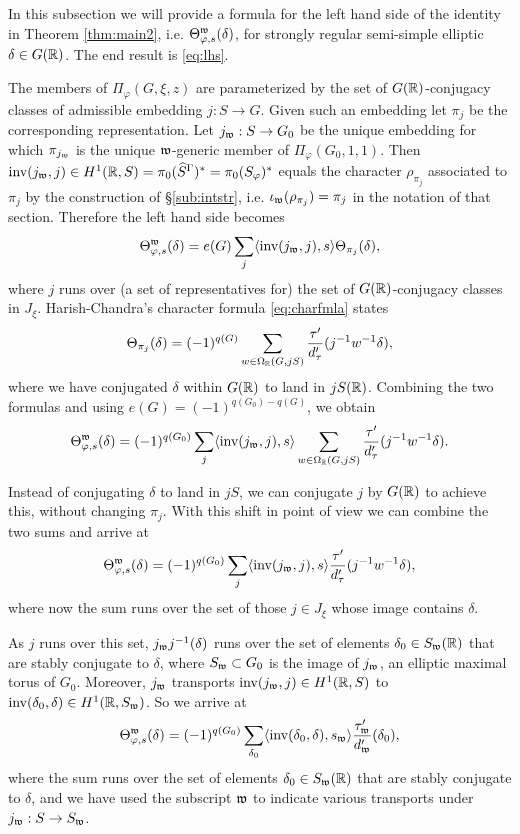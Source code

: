 \documentclass{article}
\theoremstyle{definition}
\numberwithin{equation}{section}
\renewcommand{\-}{\hyp{}}
\begin{document}
In this subsection we will provide a formula for the left hand side of the identity in Theorem \ref{thm:main2}, i.e. $\Theta^{\mathfrak{w}}_{\varphi,s}(\delta)$, for strongly regular semi-simple elliptic $\delta \in G(\mathbb{R})$. The end result is \eqref{eq:lhs}.

The members of $\Pi_\varphi(G,\xi,z)$ are parameterized by the set of $G(\mathbb{R})$-conjugacy classes of admissible embedding $j : S \to G$. Given such an embedding let $\pi_j$ be the corresponding representation. Let $j_{\mathfrak{w}} : S \to G_0$ be the unique embedding for which $\pi_{j_{\mathfrak{w}}}$ is the unique $\mathfrak{w}$-generic member of $\Pi_\varphi(G_0,1,1)$. Then $\textrm{inv}(j_{\mathfrak{w}},j) \in H^1(\mathbb{R},S)=\pi_0(\widehat S^\Gamma)^*=\pi_0(S_\varphi)^*$ equals the character $\rho_{\pi_j}$ associated to $\pi_j$ by the construction of \S\ref{sub:intstr}, i.e. $\iota_{\mathfrak{w}}(\rho_{\pi_j})=\pi_j$ in the notation of that section. Therefore the left hand side becomes
\[ \Theta^{\mathfrak{w}}_{\varphi,s}(\delta)=e(G)\sum_j \langle\textrm{inv}(j_{\mathfrak{w}},j),s\rangle\Theta_{\pi_j}(\delta), \]
where $j$ runs over (a set of representatives for) the set of $G(\mathbb{R})$-conjugacy classes in $J_\xi$. Harish-Chandra's character formula \eqref{eq:charfmla} states
\[ \Theta_{\pi_j}(\delta) = (-1)^{q(G)}\sum_{w \in \Omega_{\mathbb{R}}(G,jS)}\frac{\tau'}{d_\tau'}(j^{-1}w^{-1}\delta),\]
where we have conjugated $\delta$ within $G(\mathbb{R})$ to land in $jS(\mathbb{R})$. Combining the two formulas and using $e(G)=(-1)^{q(G_0)-q(G)}$, we obtain
\[ \Theta^{\mathfrak{w}}_{\varphi,s}(\delta) = (-1)^{q(G_0)} \sum_j \langle\textrm{inv}(j_{\mathfrak{w}},j),s\rangle \sum_{w \in \Omega_{\mathbb{R}}(G,jS)}\frac{\tau'}{d_\tau'}(j^{-1}w^{-1}\delta). \]

Instead of conjugating $\delta$ to land in $jS$, we can conjugate $j$ by $G(\mathbb{R})$ to achieve this, without changing $\pi_j$. With this shift in point of view we can combine the two sums and arrive at
\[ \Theta^{\mathfrak{w}}_{\varphi,s}(\delta) = (-1)^{q(G_0)} \sum_j \langle\textrm{inv}(j_{\mathfrak{w}},j),s\rangle \frac{\tau'}{d_\tau'}(j^{-1}w^{-1}\delta), \]
where now the sum runs over the set of those $j \in J_\xi$ whose image contains $\delta$.

As $j$ runs over this set, $j_{\mathfrak{w}}j^{-1}(\delta)$ runs over the set of elements $\delta_0 \in S_{\mathfrak{w}}(\mathbb{R})$ that are stably conjugate to $\delta$, where $S_{\mathfrak{w}} \subset G_0$ is the image of $j_{\mathfrak{w}}$, an elliptic maximal torus of $G_0$. Moreover, $j_{\mathfrak{w}}$ transports $\textrm{inv}(j_{\mathfrak{w}},j) \in H^1(\mathbb{R},S)$ to $\textrm{inv}(\delta_0,\delta) \in H^1(\mathbb{R},S_{\mathfrak{w}})$. So we arrive at
\begin{equation} \label{eq:lhs}
\Theta^{\mathfrak{w}}_{\varphi,s}(\delta) = (-1)^{q(G_0)} \sum_{\delta_0} \langle\textrm{inv}(\delta_0,\delta),s_{\mathfrak{w}}\rangle \frac{\tau_{\mathfrak{w}}'}{d_{\mathfrak{w}}'}(\delta_0),
\end{equation}
where the sum runs over the set of elements $\delta_0 \in S_{\mathfrak{w}}(\mathbb{R})$ that are stably conjugate to $\delta$, and we have used the subscript $\mathfrak{w}$ to indicate various transports under $j_{\mathfrak{w}} : S \to S_{\mathfrak{w}}$.
\end{document}
